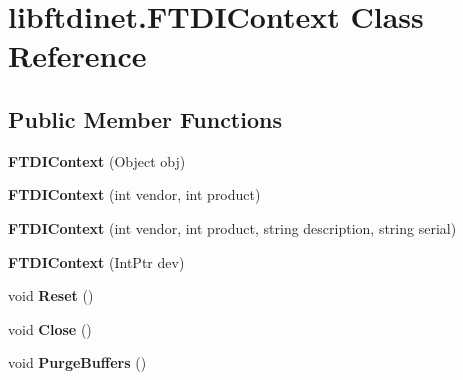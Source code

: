 \hypertarget{classlibftdinet_1_1_f_t_d_i_context}{}\section{libftdinet.\+F\+T\+D\+I\+Context Class Reference}
\label{classlibftdinet_1_1_f_t_d_i_context}
\subsection*{Public Member Functions}
\begin{DoxyCompactItemize}
\item 
\mbox{\label{classlibftdinet_1_1_f_t_d_i_context_a23c043151f52162c0d4f9d5ae41ac273}} 
{\bfseries F\+T\+D\+I\+Context} (Object obj)
\item 
\mbox{\label{classlibftdinet_1_1_f_t_d_i_context_adad07ca7224d05381e348da5e7ae52bc}} 
{\bfseries F\+T\+D\+I\+Context} (int vendor, int product)
\item 
\mbox{\label{classlibftdinet_1_1_f_t_d_i_context_ad607f9fd6c8fcf0bd2ab69a73c26cf47}} 
{\bfseries F\+T\+D\+I\+Context} (int vendor, int product, string description, string serial)
\item 
\mbox{\label{classlibftdinet_1_1_f_t_d_i_context_a89bbd8670449c2368eb7a8451903793a}} 
{\bfseries F\+T\+D\+I\+Context} (Int\+Ptr dev)
\item 
\mbox{\label{classlibftdinet_1_1_f_t_d_i_context_ae22e33a77d2acd55f936a1fd43b6f7a3}} 
void {\bfseries Reset} ()
\item 
\mbox{\label{classlibftdinet_1_1_f_t_d_i_context_a138dd0da3d2d5b15e42b9bd40df3dfca}} 
void {\bfseries Close} ()
\item 
\mbox{\label{classlibftdinet_1_1_f_t_d_i_context_abd71c13b1c092bd39c8751b7317ef5c2}} 
void {\bfseries Purge\+Buffers} ()
\item 
\mbox{\label{classlibftdinet_1_1_f_t_d_i_context_a8666685f992dc3a0bc4d04523f53bb76}} 

\end{DoxyCompactItemize}
